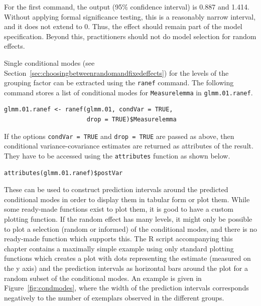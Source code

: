 For the first command, the output (95\% confidence interval) is 0.887 and 1.414.
Without applying formal significance testing, this is a reasonably narrow interval, and it does not extend to 0.
Thus, the effect should remain part of the model specification.
Beyond this, practitioners should not do model selection for random effects.

Single conditional modes (see Section~\ref{sec:choosingbetweenrandomandfixedeffects}) for the levels of the grouping factor can be extracted using the \texttt{ranef} command.
The following command stores a list of conditional modes for \texttt{Measurelemma} in \texttt{glmm.01.ranef}.

\vspace{0.5\baselineskip}

\begin{lstlisting}
glmm.01.ranef <- ranef(glmm.01, condVar = TRUE,
                       drop = TRUE)$Measurelemma
\end{lstlisting}

If the options \texttt{condVar = TRUE} and \texttt{drop = TRUE} are passed as above, then conditional variance-covariance estimates are returned as attributes of the result.
They have to be accessed using the \texttt{attributes} function as shown below.

\vspace{0.5\baselineskip}

\begin{lstlisting}
attributes(glmm.01.ranef)$postVar
\end{lstlisting}

These can be used to construct prediction intervals around the predicted conditional modes in order to display them in tabular form or plot them.
While some ready-made functions exist to plot them, it is good to have a custom plotting function.
If the random effect has many levels, it might only be possible to plot a selection (random or informed) of the conditional modes, and there is no ready-made function which supports this.
The R script accompanying this chapter contains a maximally simple example using only standard plotting functions which creates a plot with dots representing the estimate (measured on the y axis) and the prediction intervals as horizontal bars around the plot for a random subset of the conditional modes.
An example is given in Figure~\ref{fig:condmodes}, where the width of the prediction intervals corresponds negatively to the number of exemplars observed in the different groups.

